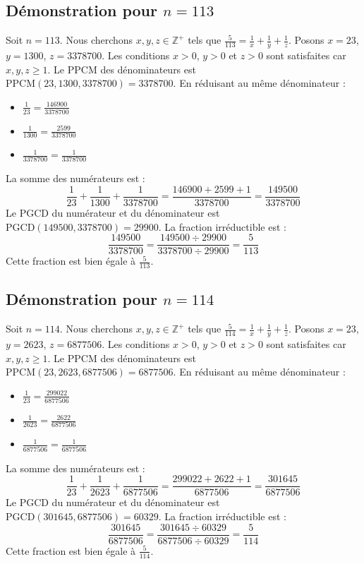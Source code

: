 \documentclass[11pt,a4paper]{article}
\begin{document}
\subsection{Démonstration pour $n = 113$}
Soit $n = 113$. Nous cherchons $x, y, z \in \mathbb{Z}^{+}$ tels que $\frac{5}{113} = \frac{1}{x} + \frac{1}{y} + \frac{1}{z}$.
Posons $x = 23$, $y = 1300$, $z = 3378700$.
Les conditions $x > 0$, $y > 0$ et $z > 0$ sont satisfaites car $x, y, z \geq 1$.
Le PPCM des dénominateurs est $\text{PPCM}(23, 1300, 3378700) = 3378700$.
En réduisant au même dénominateur :
\begin{itemize}
    \item $\frac{1}{23} = \frac{146900}{3378700}$
    \item $\frac{1}{1300} = \frac{2599}{3378700}$
    \item $\frac{1}{3378700} = \frac{1}{3378700}$
\end{itemize}
La somme des numérateurs est :
$$ \frac{1}{23} + \frac{1}{1300} + \frac{1}{3378700} = \frac{146900 + 2599 + 1}{3378700} = \frac{149500}{3378700} $$
Le PGCD du numérateur et du dénominateur est $\text{PGCD}(149500, 3378700) = 29900$.
La fraction irréductible est :
$$ \frac{149500}{3378700} = \frac{149500 \div 29900}{3378700 \div 29900} = \frac{5}{113} $$
Cette fraction est bien égale à $\frac{5}{113}$.

\subsection{Démonstration pour $n = 114$}
Soit $n = 114$. Nous cherchons $x, y, z \in \mathbb{Z}^{+}$ tels que $\frac{5}{114} = \frac{1}{x} + \frac{1}{y} + \frac{1}{z}$.
Posons $x = 23$, $y = 2623$, $z = 6877506$.
Les conditions $x > 0$, $y > 0$ et $z > 0$ sont satisfaites car $x, y, z \geq 1$.
Le PPCM des dénominateurs est $\text{PPCM}(23, 2623, 6877506) = 6877506$.
En réduisant au même dénominateur :
\begin{itemize}
    \item $\frac{1}{23} = \frac{299022}{6877506}$
    \item $\frac{1}{2623} = \frac{2622}{6877506}$
    \item $\frac{1}{6877506} = \frac{1}{6877506}$
\end{itemize}
La somme des numérateurs est :
$$ \frac{1}{23} + \frac{1}{2623} + \frac{1}{6877506} = \frac{299022 + 2622 + 1}{6877506} = \frac{301645}{6877506} $$
Le PGCD du numérateur et du dénominateur est $\text{PGCD}(301645, 6877506) = 60329$.
La fraction irréductible est :
$$ \frac{301645}{6877506} = \frac{301645 \div 60329}{6877506 \div 60329} = \frac{5}{114} $$
Cette fraction est bien égale à $\frac{5}{114}$.
\end{document}
